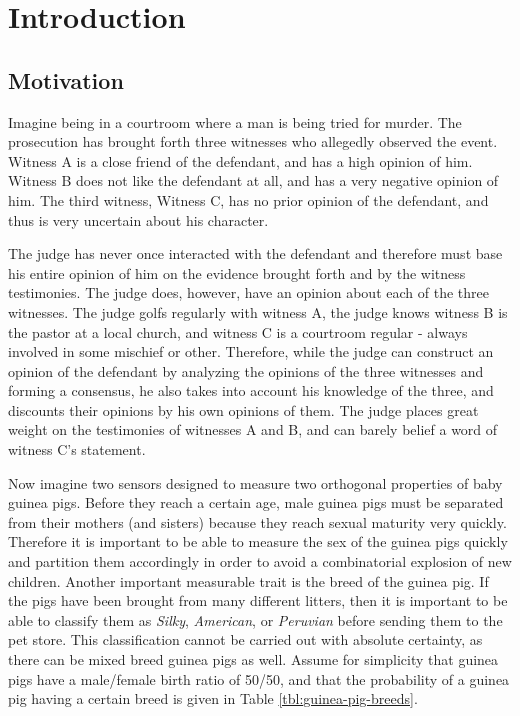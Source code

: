\documentclass[thesis.tex]{subfiles}
\begin{document}
\chapter{Introduction}



\section{Motivation}

Imagine being in a courtroom where a man is being tried for murder. The prosecution has
brought forth three witnesses who allegedly observed the event. Witness A is a close friend
of the defendant, and has a high opinion of him. Witness B does not like the defendant at
all, and has a very negative opinion of him. The third witness, Witness C, has no prior
opinion of the defendant, and thus is very uncertain about his character.

The judge has never once interacted with the defendant and therefore must base his entire
opinion of him on the evidence brought forth and by the witness testimonies. The
judge does, however, have an opinion about each of the three witnesses. The judge golfs regularly with
witness A, the judge knows witness B is the pastor at a local church, and witness C is a
courtroom regular - always involved in some mischief or other. Therefore, while the judge
can construct an opinion of the defendant by analyzing the opinions of the three witnesses and forming a
consensus, he also takes into account his knowledge of the three, and discounts their
opinions by his own opinions of them. The judge places great weight on the testimonies of
witnesses A and B, and can barely belief a word of witness C's statement.

Now imagine two sensors designed to measure two orthogonal properties of baby guinea pigs.
Before they reach a certain age, male guinea pigs must be separated from their mothers
(and sisters) because they reach sexual maturity very quickly. Therefore it is important to
be able to measure the sex of the guinea pigs quickly and partition them
accordingly in order to avoid a combinatorial explosion of new children. Another important
measurable trait is the breed of the guinea pig. If the
pigs have been brought from many different litters, then it is important to be able to
classify them as \emph{Silky}, \emph{American}, or \emph{Peruvian} before sending them to the pet store.
This classification cannot be carried out with absolute certainty, as there can be mixed breed guinea pigs as well.
Assume for simplicity that guinea pigs have a male/female birth ratio of 50/50, and that the
probability of a guinea pig having a certain breed is given in Table \ref{tbl:guinea-pig-breeds}.
\end{document}
